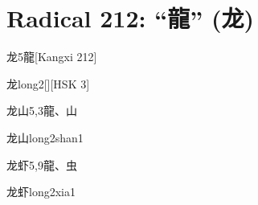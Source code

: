 
\section*{Radical 212: ``⿓'' (龙)}

\begin{entry}{龙}{5}{⿓}[Kangxi 212]
  \begin{phonetics}{龙}{long2}[][HSK 3]
  \end{phonetics}
\end{entry}

\begin{entry}{龙山}{5,3}{⿓、⼭}
  \begin{phonetics}{龙山}{long2shan1}
  \end{phonetics}
\end{entry}

\begin{entry}{龙虾}{5,9}{⿓、⾍}
  \begin{phonetics}{龙虾}{long2xia1}
  \end{phonetics}
\end{entry}


